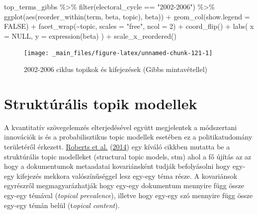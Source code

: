 \documentclass[
]{book}
\newenvironment{Shaded}{\begin{snugshade}}{\end{snugshade}}
\newcommand{\AttributeTok}[1]{\textcolor[rgb]{0.77,0.63,0.00}{#1}}
\newcommand{\ConstantTok}[1]{\textcolor[rgb]{0.00,0.00,0.00}{#1}}
\newcommand{\DecValTok}[1]{\textcolor[rgb]{0.00,0.00,0.81}{#1}}
\newcommand{\FunctionTok}[1]{\textcolor[rgb]{0.00,0.00,0.00}{#1}}
\newcommand{\NormalTok}[1]{#1}
\newcommand{\SpecialCharTok}[1]{\textcolor[rgb]{0.00,0.00,0.00}{#1}}
\newcommand{\StringTok}[1]{\textcolor[rgb]{0.31,0.60,0.02}{#1}}
\begin{document}
\begin{Shaded}
\begin{Highlighting}[]
\NormalTok{top\_terms\_gibbs }\SpecialCharTok{\%\textgreater{}\%}
  \FunctionTok{filter}\NormalTok{(electoral\_cycle }\SpecialCharTok{==} \StringTok{"2002{-}2006"}\NormalTok{) }\SpecialCharTok{\%\textgreater{}\%}
  \FunctionTok{ggplot}\NormalTok{(}\FunctionTok{aes}\NormalTok{(}\FunctionTok{reorder\_within}\NormalTok{(term, beta, topic), beta)) }\SpecialCharTok{+}
  \FunctionTok{geom\_col}\NormalTok{(}\AttributeTok{show.legend =} \ConstantTok{FALSE}\NormalTok{) }\SpecialCharTok{+}
  \FunctionTok{facet\_wrap}\NormalTok{(}\SpecialCharTok{\textasciitilde{}}\NormalTok{topic, }\AttributeTok{scales =} \StringTok{"free"}\NormalTok{, }\AttributeTok{ncol =} \DecValTok{2}\NormalTok{) }\SpecialCharTok{+}
  \FunctionTok{coord\_flip}\NormalTok{() }\SpecialCharTok{+}
  \FunctionTok{labs}\NormalTok{(}
    \AttributeTok{x =} \ConstantTok{NULL}\NormalTok{,}
    \AttributeTok{y =} \FunctionTok{expression}\NormalTok{(beta)}
\NormalTok{  ) }\SpecialCharTok{+}
  \FunctionTok{scale\_x\_reordered}\NormalTok{()}
\end{Highlighting}
\end{Shaded}

\begin{figure}

{\centering \texttt{[image: \_main\_files/figure-latex/unnamed-chunk-121-1]} 

}

\caption{2002-2006 ciklus topikok és kifejezések (Gibbs mintavétellel)}\label{fig:unnamed-chunk-121}
\end{figure}

\hypertarget{struktuxfaruxe1lis-topik-modellek}{%
\section{Struktúrális topik
modellek}\label{struktuxfaruxe1lis-topik-modellek}}

A kvantitatív szövegelemzés elterjedésével együtt megjelentek a
módszertani innovációk is és a probabilisztikus topic modellek esetében
ez a politikatudomány területéről érkezett.
\protect\hyperlink{ref-roberts2014structural}{Roberts et al.}
(\protect\hyperlink{ref-roberts2014structural}{2014}) egy kíváló cikkben
mutatta be a struktúrális topic modelleket (structural topic models,
stm) ahol a fő újítás az az hogy a dokumentumok metaadatai kovariánsként
tudják befolyásolni hogy egy-egy kifejezés mekkora valószínűséggel lesz
egy-egy téma része. A kovariánsok egyrészről megmagyarázhatják hogy
egy-egy dokumentum mennyire függ össze egy-egy témával (\emph{topical
prevalence}), illetve hogy egy-egy szó mennyire függ össze egy-egy témán
belül (t\emph{opical content}).
\end{document}

